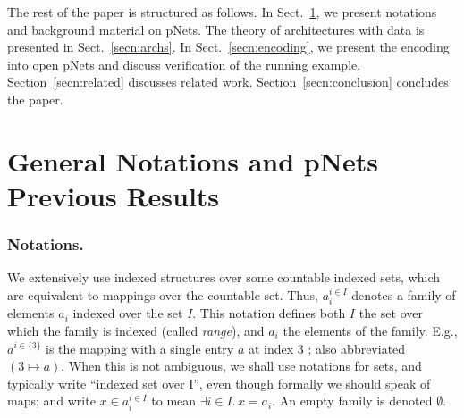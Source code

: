 \documentclass{llncs}
\newcommand{\Simon}{\\\hfill\mdash Simon}
\newcommand{\Ludo}{\\\hfill\mdash Ludo}
\newcommand{\noteIn}[2][inline,color=black!20]{\todo[#1]{{#2}}}
\newcommand{\secn}[1]{Sect.~\ref{secn:#1}}
\newcommand{\Secn}[1]{Section~\ref{secn:#1}}
\newcommand{\mdash}[1][]{---#1}
\newcommand{\eg}[1][\ ]{e.g.#1}
\begin{document}
The rest of the paper is structured as follows.  In
\secn{preliminaries}, we present notations and background
material on pNets.  The theory of architectures with data is
presented in \secn{archs}.  In \secn{encoding}, we present the
encoding into open pNets and discuss verification of the running
example.  \Secn{related} discusses related work.
\Secn{conclusion} concludes the paper.  


\section{General Notations and pNets Previous Results} 
\label{secn:preliminaries}


\subsubsection{Notations.}
\label{secn:notations}

We extensively use indexed structures
over some countable indexed sets, which are equivalent to mappings over
the countable set. 
Thus, 
$a_i^{i\in I}$
denotes a family of elements $a_i$ indexed over the
set $I$. %
This notation defines both $I$ the set over which the family is
indexed (called \emph{range}), and $a_i$ the elements of the family.
E.g., $a^{i\in\{3\}}$ is the mapping with a single entry $a$ at index
$3$ ; also abbreviated $(3\mapsto a)$.
When this is not
ambiguous, we shall use notations for sets, and typically write
``indexed set over I'', even though formally we should speak of maps; and
write $x\in a_i^{i\in I}$ to mean $\exists i\in I.\, x=a_i$.  An empty
family is denoted $\emptyset$.

%
\end{document}
